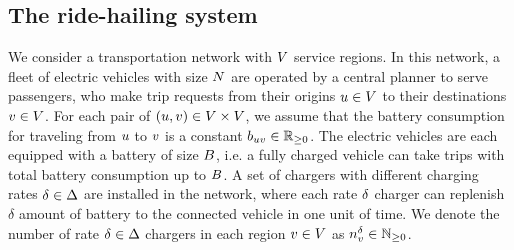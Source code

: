 \subsection{The ride-hailing system}\label{subsec:ride-hail}
We consider a transportation network with $V$ service regions. In this network, a fleet of electric vehicles with size $N$ are operated by a central planner to serve passengers, who make trip requests from their origins $u \in V$ to their destinations $v \in V$. For each pair of $(u, v) \in V \times V$, we assume that the battery consumption for traveling from $u$ to $v$ is a constant $b_{uv} \in \mathbb{R}_{\geq 0}$. The electric vehicles are each equipped with a battery of size $B$, i.e. a fully charged vehicle can take trips with total battery consumption up to $B$. A set of chargers with different charging rates $\delta \in \Delta$ are installed in the network, where each rate $\delta$ charger can replenish $\delta$ amount of battery to the connected vehicle in one unit of time. We denote the number of rate $\delta \in \Delta$ chargers in each region $v \in V$ as $n_{v}^{\delta} \in \mathbb{N}_{\geq 0}$. 




